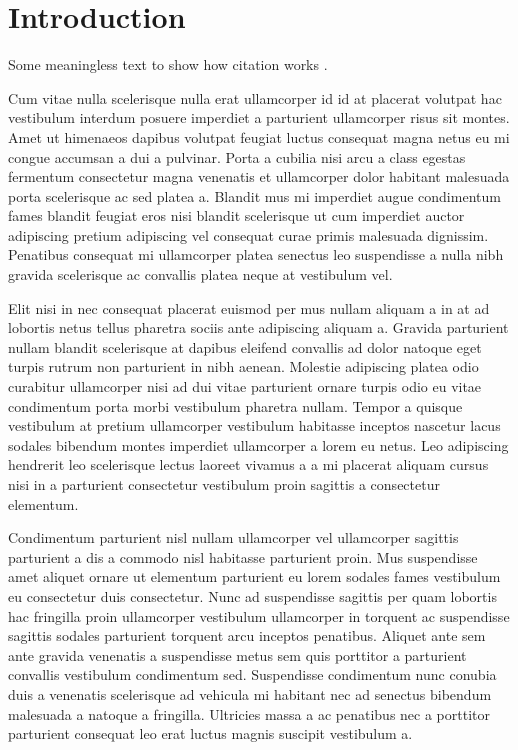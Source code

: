 \section{Introduction}
Some meaningless text to show how citation works \cite{latexcompanion}.

Cum vitae nulla scelerisque nulla erat ullamcorper id id at placerat volutpat hac vestibulum interdum posuere imperdiet a parturient ullamcorper risus sit montes. Amet ut himenaeos dapibus volutpat feugiat luctus consequat magna netus eu mi congue accumsan a dui a pulvinar. Porta a cubilia nisi arcu a class egestas fermentum consectetur magna venenatis et ullamcorper dolor habitant malesuada porta scelerisque ac sed platea a. Blandit mus mi imperdiet augue condimentum fames blandit feugiat eros nisi blandit scelerisque ut cum imperdiet auctor adipiscing pretium adipiscing vel consequat curae primis malesuada dignissim. Penatibus consequat mi ullamcorper platea senectus leo suspendisse a nulla nibh gravida scelerisque ac convallis platea neque at vestibulum vel. 

Elit nisi in nec consequat placerat euismod per mus nullam aliquam a in at ad lobortis netus tellus pharetra sociis ante adipiscing aliquam a. Gravida parturient nullam blandit scelerisque at dapibus eleifend convallis ad dolor natoque eget turpis rutrum non parturient in nibh aenean. Molestie adipiscing platea odio curabitur ullamcorper nisi ad dui vitae parturient ornare turpis odio eu vitae condimentum porta morbi vestibulum pharetra nullam. Tempor a quisque vestibulum at pretium ullamcorper vestibulum habitasse inceptos nascetur lacus sodales bibendum montes imperdiet ullamcorper a lorem eu netus. Leo adipiscing hendrerit leo scelerisque lectus laoreet vivamus a a mi placerat aliquam cursus nisi in a parturient consectetur vestibulum proin sagittis a consectetur elementum. 

Condimentum parturient nisl nullam ullamcorper vel ullamcorper sagittis parturient a dis a commodo nisl habitasse parturient proin. Mus suspendisse amet aliquet ornare ut elementum parturient eu lorem sodales fames vestibulum eu consectetur duis consectetur. Nunc ad suspendisse sagittis per quam lobortis hac fringilla proin ullamcorper vestibulum ullamcorper in torquent ac suspendisse sagittis sodales parturient torquent arcu inceptos penatibus. Aliquet ante sem ante gravida venenatis a suspendisse metus sem quis porttitor a parturient convallis vestibulum condimentum sed. Suspendisse condimentum nunc conubia duis a venenatis scelerisque ad vehicula mi habitant nec ad senectus bibendum malesuada a natoque a fringilla. Ultricies massa a ac penatibus nec a porttitor parturient consequat leo erat luctus magnis suscipit vestibulum a. 

